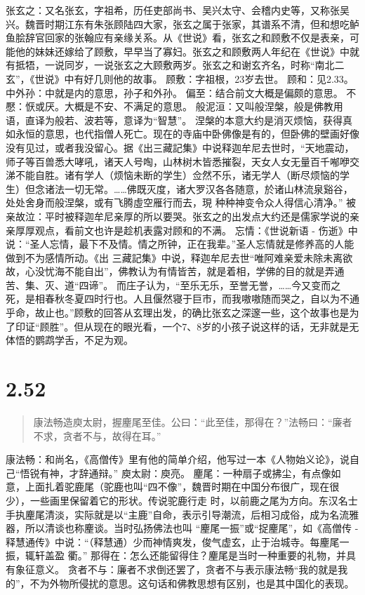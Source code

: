 \documentclass[]{book}
\begin{document}
张玄之：又名张玄，字祖希，历任吏部尚书、吴兴太守、会稽内史等，又称张吴兴。魏晋时期江东有朱张顾陆四大家，张玄之属于张家，其谱系不清，但和想吃鲈鱼脍辞官回家的张翰应有亲缘关系。从《世说》看，张玄之和顾敷不仅是表亲，可能他的妹妹还嫁给了顾敷，早早当了寡妇。张玄之和顾敷两人年纪在《世说》中就有抵牾，一说同岁，一说张玄之大顾敷两岁。张玄之和谢玄齐名，时称``南北二玄''，《世说》中有好几则他的故事。
顾敷：字祖根，23岁去世。 顾和：见2.33。
中外孙：中就是内的意思，孙子和外孙。 偏至：结合前文大概是偏颇的意思。
不懕：恹或厌。大概是不安、不满足的意思。
般泥洹：又叫般涅槃，般是佛教用语，直译为般若、波若等，意译为``智慧''。
涅槃的本意大约是消灭烦恼，获得真如永恒的意思，也代指僧人死亡。现在的寺庙中卧佛像是有的，但卧佛的壁画好像没有见过，或者我没留心。据《出三藏記集》中说释迦牟尼去世时，``天地震动，师子等百兽悉大哮吼，诸天人号啕，山林树木皆悉摧裂，天女人女无量百千喐咿交涕不能自胜。诸有学人（烦恼未断的学生）佥然不乐，诸无学人（断尽烦恼的学生）但念诸法一切无常。\ldots{}\ldots{}佛既灭度，诸大罗汉各各随意，於诸山林流泉谿谷，处处舍身而般涅槃，或有飞腾虛空雁行而去，現
种种神变令众人得信心清净。''
被亲故泣：平时被释迦牟尼亲厚的所以要哭。张玄之的出发点大约还是儒家学说的亲亲厚厚观点，看前文也许是趁机表露对顾和的不满。
忘情：《世说新语 -
伤逝》中说：``圣人忘情，最下不及情。情之所钟，正在我辈。''圣人忘情就是修养高的人能做到不为感情所动。《出
三藏記集》中说，释迦牟尼去世``唯阿难亲爱未除未离欲故，心没忧海不能自出''，佛教认为有情皆苦，就是着相，学佛的目的就是弄通苦、集、灭、道``四谛''。
而庄子认为，``至乐无乐，至誉无誉，\ldots{}\ldots{}今又变而之死，是相春秋冬夏四时行也。人且偃然寝于巨市，而我嗷嗷随而哭之，自以为不通乎命，故止也。''顾敷的回答从玄理出发，的确比张玄之深邃一些，这个故事也是为了印证``顾胜''。但从现在的眼光看，一个7、8岁的小孩子说这样的话，无非就是无体悟的鹦鹉学舌，不足为观。

\section{2.52}\label{section-98}

\begin{quote}
康法畅造庾太尉，握麈尾至佳。公曰：``此至佳，那得在？''法畅曰：``廉者不求，贪者不与，故得在耳。''
\end{quote}

康法畅：和尚名，《高僧传》里有他的简单介绍，他写过一本《人物始义论》，说自己``悟锐有神，才辞通辩。''
庾太尉：庾亮。
麈尾：一种扇子或拂尘，有点像如意，上面扎着驼鹿尾（驼鹿也叫``四不像''，魏晋时期在中国分布很广，现在很少），一些画里保留着它的形状。传说驼鹿行走
时，以前鹿之尾为方向。东汉名士手执麈尾清淡，实际就是以``主鹿''自命，表示引导潮流，后相习成俗，成为名流雅器，所以清谈也称麈谈。当时弘扬佛法也叫
``麈尾一振''或``捉麈尾''，如《高僧传 -
释慧通传》中说：``（释慧通）少而神情爽发，俊气虚玄，止于治城寺。每麈尾一振，辄轩盖盈
衢。''
那得在：怎么还能留得住？麈尾是当时一种重要的礼物，并具有象征意义。
贪者不与：廉者不求倒还罢了，贪者不与表示康法畅``我的就是我的''，不为外物所侵扰的意思。这句话和佛教思想有区别，也是其中国化的表现。
\end{document}
